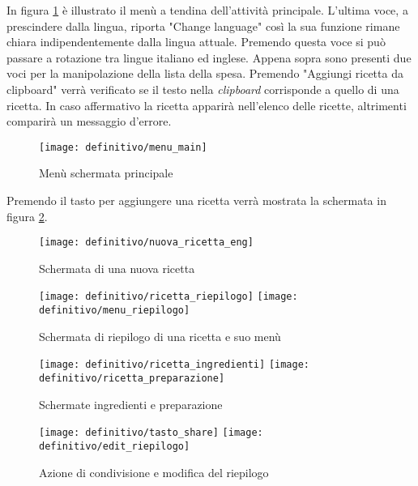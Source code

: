 In figura \ref{fig:def_main_2} è illustrato il menù a tendina dell'attività principale.
L'ultima voce, a prescindere dalla lingua, riporta "Change language" così la sua funzione rimane chiara indipendentemente dalla lingua attuale.
Premendo questa voce si può passare a rotazione tra lingue italiano ed inglese.
Appena sopra sono presenti due voci per la manipolazione della lista della spesa.
Premendo "Aggiungi ricetta da clipboard" verrà verificato se il testo nella \textit{clipboard} corrisponde a quello di una ricetta.
In caso affermativo la ricetta apparirà nell'elenco delle ricette, altrimenti comparirà un messaggio d'errore.

\begin{figure}[ht]
  \begin{center}
    \texttt{[image: definitivo/menu\_main]}
    \caption{Menù schermata principale}
    \label{fig:def_main_2}
  \end{center}
\end{figure}
\clearpage

Premendo il tasto per aggiungere una ricetta verrà mostrata la schermata in figura \ref{fig:def_nuova}.
\begin{figure}[ht]
  \begin{center}
    \texttt{[image: definitivo/nuova\_ricetta\_eng]}
    \caption{Schermata di una nuova ricetta}
    \label{fig:def_nuova}
  \end{center}
\end{figure}

\begin{figure}[ht]
  \begin{center}
    \texttt{[image: definitivo/ricetta\_riepilogo]}
    \texttt{[image: definitivo/menu\_riepilogo]}
    \caption{Schermata di riepilogo di una ricetta e suo menù}
    \label{fig:def_ricetta}
  \end{center}
\end{figure}

\begin{figure}[ht]
  \begin{center}
    \texttt{[image: definitivo/ricetta\_ingredienti]}
    \texttt{[image: definitivo/ricetta\_preparazione]}
    \caption{Schermate ingredienti e preparazione}
    \label{fig:def_ricetta_1}
  \end{center}
\end{figure}

\begin{figure}[ht]
   \begin{center}
    \texttt{[image: definitivo/tasto\_share]}
    \texttt{[image: definitivo/edit\_riepilogo]}
    \caption{Azione di condivisione e modifica del riepilogo}
    \label{fig:def_ricetta_2}
  \end{center}
\end{figure}

